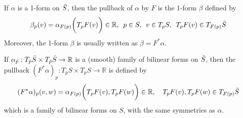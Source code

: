 \documentclass[10pt]{article}
\begin{document}
            \begin{example}
                If $\alpha$ is a 1-form on $\Bar{S}$, then the pullback of $\alpha$ by $F$ is the 1-form $\beta$ defined by
                \begin{equation*}
                    \begin{aligned}
                        \beta_p(v) = \alpha_{F(p)}\bigg( T_pF(v) \bigg)\in\mathbb{R}, \thinspace\thinspace\thinspace p\in S,\thinspace\thinspace\thinspace v\in T_pS, \thinspace\thinspace\thinspace T_pF(v)\in T_{F(p)}\Bar{S}
                    \end{aligned}
                \end{equation*}
                Moreover, the 1-form $\beta$ is usually written as $\beta = F^*\alpha$.
            \end{example}
            \begin{example}
                If $\alpha_{\Bar{p}}: T_{\Bar{p}}\Bar{S}\times T_{\Bar{p}}\Bar{S}\rightarrow\mathbb{R}$ is a (smooth) family of bilinear forms on $\Bar{S}$, then the pullback $(F^*\alpha)_p: T_pS\times T_pS\rightarrow\mathbb{R}$ is defined by
                \begin{equation*}
                    \begin{aligned}
                        (F^*\alpha)_p(v, w) = \alpha_{F(p)}\bigg( T_pF(v), T_pF(w) \bigg)\in\mathbb{R},\quad T_pF(v), T_pF(w)\in T_{F(p)}\Bar{S}
                    \end{aligned}
                \end{equation*}
                which is a family of bilinear forms on $S$, with the same symmetries as $\alpha$.
            \end{example}
            
\end{document}
